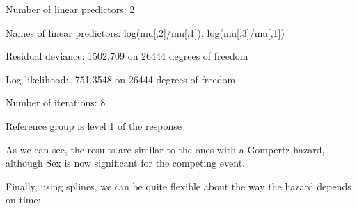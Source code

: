 \documentclass[article]{jss}
\begin{document}
\begin{CodeChunk}
\begin{CodeOutput}
Number of linear predictors:  2 

Names of linear predictors: log(mu[,2]/mu[,1]), log(mu[,3]/mu[,1])

Residual deviance: 1502.709 on 26444 degrees of freedom

Log-likelihood: -751.3548 on 26444 degrees of freedom

Number of iterations: 8 

Reference group is level  1  of the response
\end{CodeOutput}
\end{CodeChunk}

As we can see, the results are similar to the ones with a Gompertz
hazard, although Sex is now significant for the competing event.

Finally, using splines, we can be quite flexible about the way the
hazard depends on time:
\end{document}
